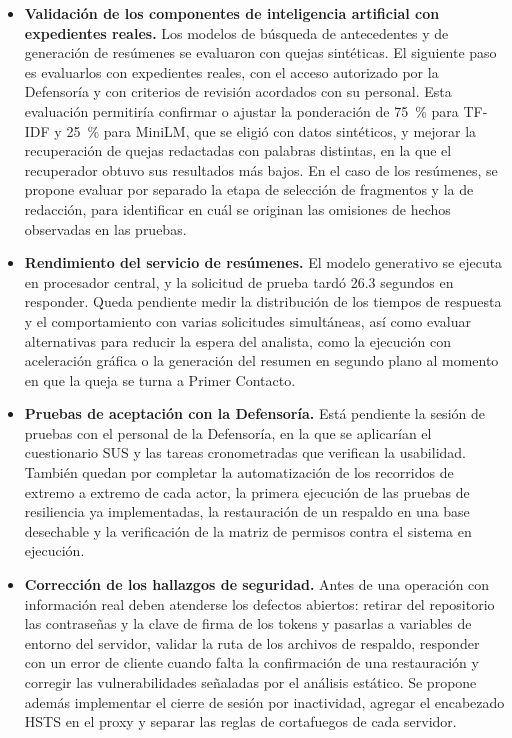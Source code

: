 \begin{itemize}
	\item \textbf{Validación de los componentes de inteligencia artificial con expedientes reales.} Los modelos de búsqueda de antecedentes y de generación de resúmenes se evaluaron con quejas sintéticas. El siguiente paso es evaluarlos con expedientes reales, con el acceso autorizado por la Defensoría y con criterios de revisión acordados con su personal. Esta evaluación permitiría confirmar o ajustar la ponderación de 75~\% para TF-IDF y 25~\% para MiniLM, que se eligió con datos sintéticos, y mejorar la recuperación de quejas redactadas con palabras distintas, en la que el recuperador obtuvo sus resultados más bajos. En el caso de los resúmenes, se propone evaluar por separado la etapa de selección de fragmentos y la de redacción, para identificar en cuál se originan las omisiones de hechos observadas en las pruebas.

	\item \textbf{Rendimiento del servicio de resúmenes.} El modelo generativo se ejecuta en procesador central, y la solicitud de prueba tardó 26.3 segundos en responder. Queda pendiente medir la distribución de los tiempos de respuesta y el comportamiento con varias solicitudes simultáneas, así como evaluar alternativas para reducir la espera del analista, como la ejecución con aceleración gráfica o la generación del resumen en segundo plano al momento en que la queja se turna a Primer Contacto.

	\item \textbf{Pruebas de aceptación con la Defensoría.} Está pendiente la sesión de pruebas con el personal de la Defensoría, en la que se aplicarían el cuestionario SUS y las tareas cronometradas que verifican la usabilidad. También quedan por completar la automatización de los recorridos de extremo a extremo de cada actor, la primera ejecución de las pruebas de resiliencia ya implementadas, la restauración de un respaldo en una base desechable y la verificación de la matriz de permisos contra el sistema en ejecución.

	\item \textbf{Corrección de los hallazgos de seguridad.} Antes de una operación con información real deben atenderse los defectos abiertos: retirar del repositorio las contraseñas y la clave de firma de los tokens y pasarlas a variables de entorno del servidor, validar la ruta de los archivos de respaldo, responder con un error de cliente cuando falta la confirmación de una restauración y corregir las vulnerabilidades señaladas por el análisis estático. Se propone además implementar el cierre de sesión por inactividad, agregar el encabezado HSTS en el proxy y separar las reglas de cortafuegos de cada servidor.


\end{itemize}
